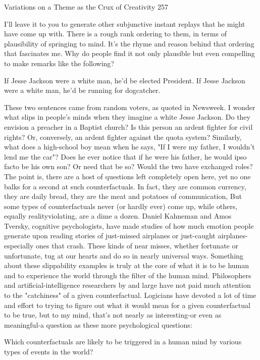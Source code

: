 Variations on a Theme as the Crux of Creativity                                     257

I'll leave it to you to generate other subjunctive instant replays that he might have
come up with. There is a rough rank ordering to them, in terms of plausibility of
springing to mind. It's the rhyme and reason behind that ordering that fascinates me.
Why do people find it not only plausible but even compelling to make remarks like
the following?

       If Jesse Jackson were a white man, he'd be elected President.
       If Jesse Jackson were a white man, he'd be running for dogcatcher.

These two sentences came from random voters, as quoted in Newsweek. I wonder
what slips in people's minds when they imagine a white Jesse Jackson. Do they
envision a preacher in a Baptist church? Is this person an ardent fighter for civil
rights? Or, conversely, an ardent fighter against the quota system? Similarly, what
does a high-school boy mean when he says, "If I were my father, I wouldn't lend me
the car"? Does he ever notice that if he were his father, he would ipso facto be his
own son? Or need that be so? Would the two have exchanged roles? The point is,
there are a host of questions left completely open here, yet no one balks for a second
at such counterfactuals. In fact, they are common currency, they are daily bread, they
are the meat and potatoes of communication, But some types of counterfactuals never
(or hardly ever) come up, while others, equally realityviolating, are a dime a dozen.
Daniel Kahneman and Amos Tversky, cognitive psychologists, have made studies of
how much emotion people generate upon reading stories of just-missed airplanes or
just-caught airplanes-especially ones that crash. These kinds of near misses, whether
fortunate or unfortunate, tug at our hearts and do so in nearly universal ways.
Something about these slippability examples is truly at the core of what it is to be
human and to experience the world through the filter of the human mind.
Philosophers and artificial-intelligence researchers by and large have not paid much
attention to the "catchiness" of a given counterfactual. Logicians have devoted a lot of
time and effort to trying to figure out what it would mean for a given counterfactual to
be true, but to my mind, that's not nearly as interesting-or even as meaningful-a
question as these more psychological questions:

       Which counterfactuals are likely to be triggered in a human mind by various
       types of events in the world?

